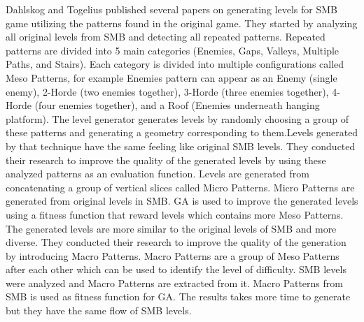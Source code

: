 Dahlskog and Togelius\cite{superMarioPattern1, superMarioPattern2, superMarioPattern3, superMarioPattern4} published several papers on generating levels for SMB game utilizing the patterns found in the original game. They started\cite{superMarioPattern1} by analyzing all original levels from SMB and detecting all repeated patterns. Repeated patterns are divided into 5 main categories (Enemies, Gaps, Valleys, Multiple Paths, and Stairs). Each category is divided into multiple configurations called Meso Patterns, for example Enemies pattern can appear as an Enemy (single enemy), 2-Horde (two enemies together), 3-Horde (three enemies together), 4-Horde (four enemies together), and a Roof (Enemies underneath hanging platform). The level generator generates levels by randomly choosing a group of these patterns and generating a geometry corresponding to them.Levels generated by that technique have the same feeling like original SMB levels. They conducted their research\cite{superMarioPattern2, superMarioPattern3} to improve the quality of the generated levels by using these analyzed patterns as an evaluation function. Levels are generated from concatenating a group of vertical slices called Micro Patterns. Micro Patterns are generated from original levels in SMB. GA is used to improve the generated levels using a fitness function that reward levels which contains more Meso Patterns. The generated levels are more similar to the original levels of SMB and more diverse. They conducted their research\cite{superMarioPattern4} to improve the quality of the generation by introducing Macro Patterns. Macro Patterns are a group of Meso Patterns after each other which can be used to identify the level of difficulty. SMB levels were analyzed and Macro Patterns are extracted from it. Macro Patterns from SMB is used as fitness function for GA. The results takes more time to generate but they have the same flow of SMB levels.\\\par

